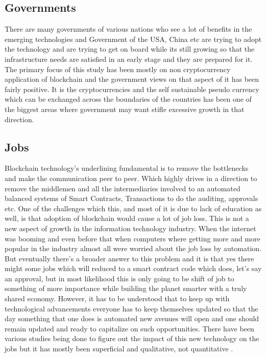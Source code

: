 \subsection{Governments}

There are many governments of various nations who see a lot of benefits in the emerging technologies and Government of the USA, China etc are trying to adopt the technology and are trying to get on board while its still growing so that the infrastructure needs are satisfied in an early stage and they are prepared for it. The primary focus of this study has been mostly on non cryptocurrency application of blockchain and the government views on that aspect of it has been fairly positive. It is the cryptocurrencies and the self sustainable pseudo currency which can be exchanged across the boundaries of the countries has been one of the biggest areas where government may want stifle excessive growth in that direction.

\subsection{Jobs}

Blockchain technology's underlining fundamental is to remove the bottlenecks and make the communication peer to peer. Which highly drives in a direction to remove the middlemen and all the intermediaries involved to an automated balanced systems of Smart Contracts, Transactions to do the auditing, approvals etc. One of the challenges which this, and most of it is due to lack of education as well, is that adoption of blockchain would cause a lot of job loss. This is not a new aspect of growth in the information technology industry. When the internet was booming and even before that when computers where getting more and more popular in the industry almost all were worried about the job loss by automation. But eventually there's a broader answer to this problem and it is that yes there might some jobs which will reduced to a smart contract code which does, let's say an approval, but in most likelihood this is only going to be shift of job to something of more importance while building the planet smarter with a truly shared economy. However, it has to be understood that to keep up with technological advancements everyone has to keep themselves updated so that the day something that one does is automated new avenues will open and one should remain updated and ready to capitalize on such opportunities. There have been various studies being done to figure out the impact of this new technology on the jobs but it has mostly been superficial and qualitative, not quantitative \cite{michael34}.


